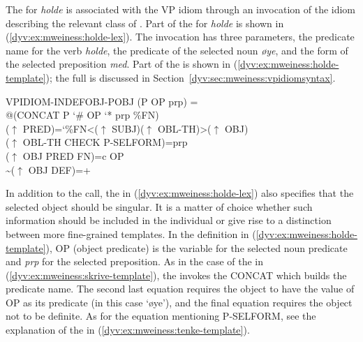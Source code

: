\documentclass[output=paper]{langsci/langscibook}
\begin{document}
The  for \textit{holde} is associated with the VP idiom through an invocation of the idiom  describing the relevant class of .
Part of the  for \textit{holde} is shown in  (\ref{dyv:ex:mweiness:holde-lex}).
The  invocation has three parameters, the predicate name for the verb \textit{holde}, the predicate of the selected noun \textit{øye},  and the form of the selected preposition \textit{med}.
Part of the  is shown in  (\ref{dyv:ex:mweiness:holde-template}); the full  is discussed in Section~\ref{dyv:sec:mweiness:vpidiomsyntax}.


\ea\label{dyv:ex:mweiness:holde-template}
{\small 
 VPIDIOM-INDEFOBJ-POBJ (P OP prp) =\\
\hspace{1.5em} @(CONCAT P `\# OP `* prp \%FN)\\
\hspace{1.5em}  ($\uparrow$  PRED)=`\%FN<($\uparrow$ SUBJ)($\uparrow$ OBL-TH)>($\uparrow$ OBJ)\\
\hspace{1.5em} ($\uparrow$ OBL-TH CHECK P-SELFORM)=prp\\
\hspace{1.5em} ($\uparrow$ OBJ PRED FN)=c OP\\
\hspace{1.5em} {\textasciitilde}($\uparrow$ OBJ DEF)=+
}
\z

In addition to the  call, the  in   (\ref{dyv:ex:mweiness:holde-lex}) also specifies that the selected object should be singular.
It is a matter of choice whether such information should be included in the individual  or give rise to a distinction between more fine-grained templates.
In the  definition in (\ref{dyv:ex:mweiness:holde-template}), OP (object predicate) is the variable for the selected noun predicate and \emph{prp} for the selected preposition.
As in the case of the  in (\ref{dyv:ex:mweiness:skrive-template}), the  invokes the CONCAT  which builds the predicate name.
The second last equation requires the object to have the value of OP as its predicate (in this case `øye'), and the final equation requires the object not to be definite.
As for the equation mentioning P-SELFORM, see the explanation of the  in (\ref{dyv:ex:mweiness:tenke-template}).
\end{document}
